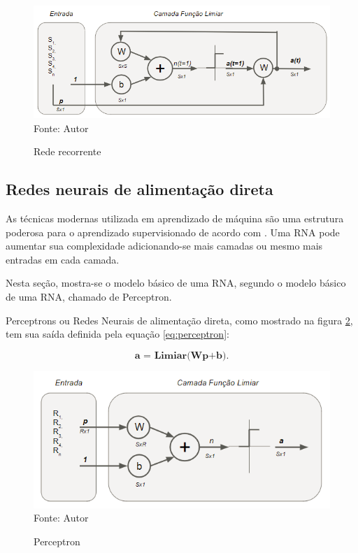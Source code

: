 \documentclass[
	12pt,				%
    oneside,			%
	a4paper,			%
	english,			%
	french,				%
	spanish,			%
	brazil,				%
	]{abntex2}
\begin{document}
\begin{figure}[H]
    \centering
    \caption{Rede recorrente}
    \includegraphics[scale=0.75]{Rede_recorrente1}\\
    Fonte: Autor\hfill
    \label{fig:rederecorrente}
\end{figure}


\subsection{Redes neurais de alimentação direta}

As técnicas modernas utilizada em aprendizado de máquina são uma estrutura poderosa para o aprendizado supervisionado de acordo com . Uma RNA pode aumentar sua complexidade adicionando-se mais camadas ou mesmo mais entradas em cada camada. 

Nesta seção, mostra-se o modelo básico de uma RNA, segundo  o modelo básico de uma RNA, chamado de Perceptron. 


Perceptrons ou Redes Neurais de alimentação direta, como mostrado na figura \ref{fig:perceptron},  tem sua saída definida pela equação \ref{eq:perceptron}:

 \begin{equation}
    \textbf{a  = Limiar(Wp+b)}.
    \label{eq:perceptron}
  \end{equation} 
  
\begin{figure}[H]
    \centering
    \caption{Perceptron}
    \includegraphics[scale=1]{perceptron1}\\
    Fonte: Autor\hfill
    \label{fig:perceptron}
\end{figure}
\end{document}
